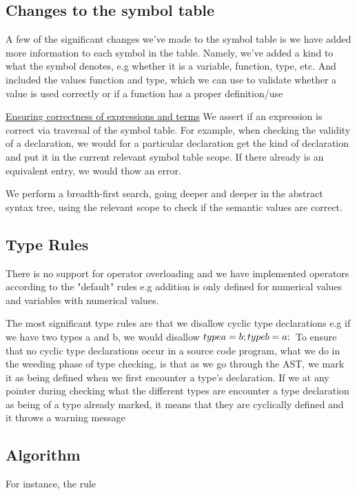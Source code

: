 \documentclass{article}
\begin{document}
\subsection{Changes to the symbol table}
A few of the significant changes we've made to the symbol table is we have added more information to each symbol in the table. Namely, we've added a kind to what the symbol denotes, e.g whether it is a variable, function, type, etc. And included the values function and type, which we can use to validate whether a value is used correctly or if a function has a proper definition/use

\underline{Ensuring correctness of expressions and terms}
We assert if an expression is correct via traversal of the symbol table. For example, when checking the validity of a declaration, we would for a particular declaration get the kind of declaration and put it in the current relevant symbol table scope. If there already is an equivalent entry, we would thow an error.

We perform a breadth-first search, going deeper and deeper in the abstract syntax tree, using the relevant scope to check if the semantic values are correct.

\subsection{Type Rules}
There is no support for operator overloading and we have implemented operators according to the "default" rules e.g addition is only defined for numerical values and variables with numerical values.

The most significant type rules are that we disallow cyclic type declarations e.g if we have two types a and b, we would disallow
$
type a = b; \\
type b = a; \\
$
To ensure that no cyclic type declarations occur in a source code program, what we do in the weeding phase of type checking, is that as we go through the AST, we mark it as being defined when we first encounter a type's declaration. If we at any pointer during checking what the different types are encounter a type declaration as being of a type already marked, it means that they are cyclically defined and it throws a warning message

\subsection{Algorithm}
For instance, the rule
\end{document}

